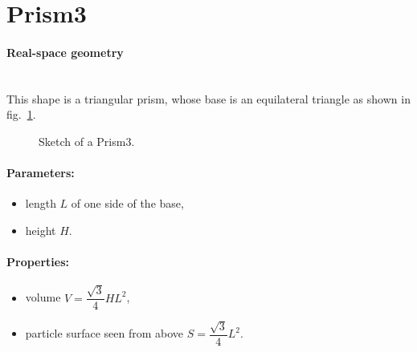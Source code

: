 \newpage
\section{Prism3}  

\paragraph{Real-space geometry}\mbox{}\\
This shape is a triangular prism, whose base is an equilateral
triangle as shown in fig.~\ref{fig:prism3}.

\begin{figure}[ht]
\hfill
{}
\hfill
{}
\hfill
\caption{Sketch of a Prism3.}
\label{fig:prism3}
\end{figure}

\FloatBarrier

\paragraph{Parameters:}
\begin{itemize}
\item length $L$ of one side of the base, 
\item height $H$.
\end{itemize}

\paragraph{Properties:}
\begin{itemize}
\item volume $V= \dfrac{\sqrt{3}}{4} H L^2$,
\item particle surface seen from above $S =\dfrac{\sqrt{3}}{4}L^2$.

\end{itemize}

